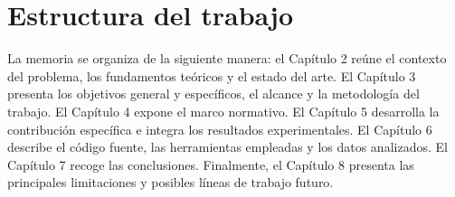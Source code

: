 \section{Estructura del trabajo}

La memoria se organiza de la siguiente manera: el Capítulo 2 reúne el contexto del problema, los fundamentos teóricos y el estado del arte. El Capítulo 3 presenta los objetivos general y específicos, el alcance y la metodología del trabajo. El Capítulo 4 expone el marco normativo. El Capítulo 5 desarrolla la contribución específica e integra los resultados experimentales. El Capítulo 6 describe el código fuente, las herramientas empleadas y los datos analizados. El Capítulo 7 recoge las conclusiones. Finalmente, el Capítulo 8 presenta las principales limitaciones y posibles líneas de trabajo futuro.
